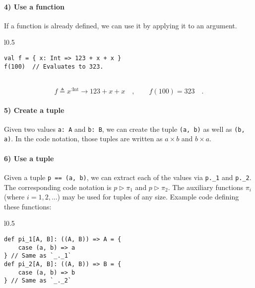 \paragraph{4) Use a function}

If a function is already defined, we can use it by applying it to
an argument.

\begin{wrapfigure}{l}{0.5\columnwidth}%
\vspace{-0.65\baselineskip}
\begin{lstlisting}
val f = { x: Int => 123 + x + x }
f(100)  // Evaluates to 323.
\end{lstlisting}

\vspace{-0.25\baselineskip}
\end{wrapfigure}%

~\vspace{-0.65\baselineskip}
\[
f\triangleq x^{:\text{Int}}\rightarrow123+x+x\quad,\quad\quad f(100)=323\quad.
\]
\vspace{-0.85\baselineskip}


\paragraph{5) Create a tuple}

Given two values \lstinline!a: A! and \lstinline!b: B!, we can create
the tuple \lstinline!(a, b)! as well as \lstinline!(b, a)!. In the
code notation, those tuples are written as $a\times b$ and $b\times a$.

\paragraph{6) Use a tuple}

Given a tuple \lstinline!p == (a, b)!, we can extract each of the
values via \lstinline!p._1! and \lstinline!p._2!. The corresponding
code notation is $p\triangleright\pi_{1}$ and $p\triangleright\pi_{2}$.
The auxiliary functions $\pi_{i}$ (where $i=1,2,...$) may be used
for tuples of any size. Example code defining these functions:

\begin{wrapfigure}{l}{0.5\columnwidth}%
\vspace{-0.75\baselineskip}
\begin{lstlisting}
def pi_1[A, B]: ((A, B)) => A = {
    case (a, b) => a
} // Same as `_._1`
def pi_2[A, B]: ((A, B)) => B = {
    case (a, b) => b
} // Same as `_._2`
\end{lstlisting}

\vspace{-1.2\baselineskip}
\end{wrapfigure}%

